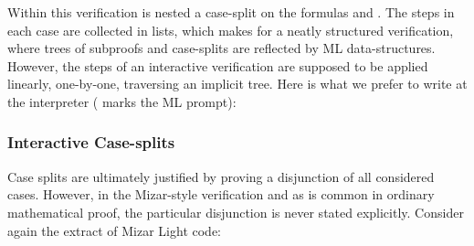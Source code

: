 Within this verification is nested a case-split on the formulas  and \linebreak{}. The steps in each case are collected in lists, which makes for a neatly structured verification, where trees of subproofs and case-splits are reflected by ML data-structures. However, the steps of an interactive verification are supposed to be applied linearly, one-by-one, traversing an implicit tree. Here is what we prefer to write at the interpreter (\code{>} marks the ML prompt):

\vspace{0.5cm}
\begin{minipage}{\linewidth}
  \footnotesize







\end{minipage}
\vspace{0.5cm}

\subsubsection{Interactive Case-splits}
Case splits are ultimately justified by proving a disjunction of all considered cases. However, in the Mizar-style verification and as is common in ordinary mathematical proof, the particular disjunction is never stated explicitly. Consider again the extract of Mizar Light code:

\vspace{0.5cm}
\begin{minipage}{\linewidth}
  \footnotesize

  \code{\quad\enspace[[suppose "p1 = p2";}

  \code{\qquad\enspace qed from [0] by [LEMMA1]];}

  \code{\qquad [suppose "$\neg$(p1 = p2)";}

  \code{\qquad\enspace qed from [1]]]];}
\end{minipage}
\vspace{0.5cm}

